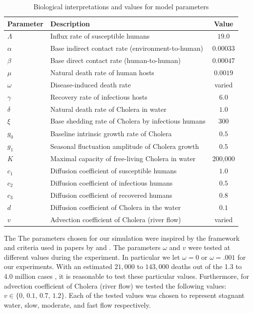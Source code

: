 \begin{table}[H]
\centering
\caption{Biological interpretations and values for model parameters}
\label{tab:parameters}
\renewcommand{\arraystretch}{1.3} 
\begin{tabular}{llc}
\hline
\textbf{Parameter} & \textbf{Description} & \textbf{Value} \\ \hline
$\Lambda$ & Influx rate of susceptible humans & $19.0$ \\
$\alpha$ & Base indirect contact rate (environment-to-human) & $0.00033$ \\
$\beta$ & Base direct contact rate (human-to-human) & $0.00047$ \\
$\mu$ & Natural death rate of human hosts & $0.0019$ \\
$\omega$ & Disease-induced death rate & varied \\
$\gamma$ & Recovery rate of infectious hosts & $6.0$ \\
$\delta$ & Natural death rate of Cholera in water & $1.0$ \\
$\xi$ & Base shedding rate of Cholera by infectious humans & $300$ \\
$g_0$ & Baseline intrinsic growth rate of Cholera & $0.5$ \\
$g_1$ & Seasonal fluctuation amplitude of Cholera growth & $0.5$ \\
$K$ & Maximal capacity of free-living Cholera in water & 200,000 \\
$c_1$ & Diffusion coefficient of susceptible humans & $1.0$ \\
$c_2$ & Diffusion coefficient of infectious humans & $0.5$ \\
$c_3$ & Diffusion coefficient of recovered humans & $0.8$ \\
$d$ & Diffusion coefficient of Cholera in the water & $0.1$ \\
$v$ & Advection coefficient of Cholera (river flow) & varied \\ \hline
\end{tabular}
\end{table}
The 
The parameters chosen for our simulation were inspired by the framework and criteria used in papers by \cite{wang_reaction-advection-diffusion_2022} and \cite{wu_threshold_2024}. The parameters $\omega$ and $v$ were tested at different values during the experiment. In particular we let $\omega = 0$ or $\omega  = .001$ for our experiments. With an estimated $21,000$ to $143,000$ deaths out of the 1.3 to 4.0 million cases \cite{who_cholera_2025}, it is reasonable to test these particular values. Furthermore, for advection coefficient of Cholera (river flow) we tested the following values: 
$v \in \{ 0, \, 0.1, \, 0.7, \, 1.2\}$. Each of the tested values was chosen to represent stagnant water, slow, moderate, and fast flow respectively. 


